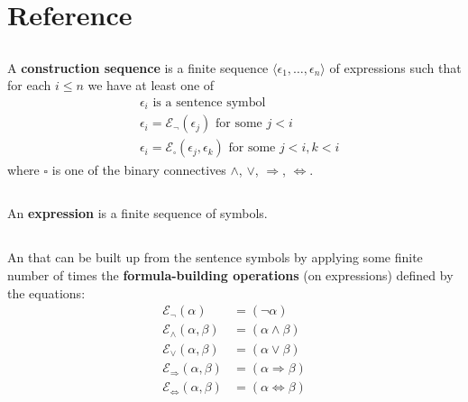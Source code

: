 \documentclass{report}
\begin{document}

\tableofcontents

\begingroup
\renewcommand\thechapter{R}

\chapter{Reference}%

\section{}%

  A \textbf{construction sequence} is a finite sequence
    $\langle \epsilon_1, \ldots, \epsilon_n \rangle$ of expressions such that
    for each $i \leq n$ we have at least one of
    \begin{align*}
      & \epsilon_i \text{ is a sentence symbol} \\
      & \epsilon_i = \mathcal{E}_\neg(\epsilon_j) \text{ for some } j < i \\
      & \epsilon_i = \mathcal{E}_\square(\epsilon_j, \epsilon_k)
        \text{ for some } j < i, k < i
    \end{align*}
    where $\square$ is one of the binary connectives $\land$, $\lor$,
      $\Rightarrow$, $\Leftrightarrow$.

\section{}%

  An \textbf{expression} is a finite sequence of symbols.

\section{}%

  An  that can be built up from the sentence symbols by
    applying some finite number of times the
    \textbf{formula-building operations} (on expressions) defined by the
    equations:
    \begin{align*}
      \mathcal{E}_{\neg}(\alpha)
        & = (\neg \alpha) \\
      \mathcal{E}_{\land}(\alpha, \beta)
        & = (\alpha \land \beta) \\
      \mathcal{E}_{\lor}(\alpha, \beta)
        & = (\alpha \lor \beta) \\
      \mathcal{E}_{\Rightarrow}(\alpha, \beta)
        & = (\alpha \Rightarrow \beta) \\
      \mathcal{E}_{\Leftrightarrow}(\alpha, \beta)
        & = (\alpha \Leftrightarrow \beta)
    \end{align*}
\end{document}
